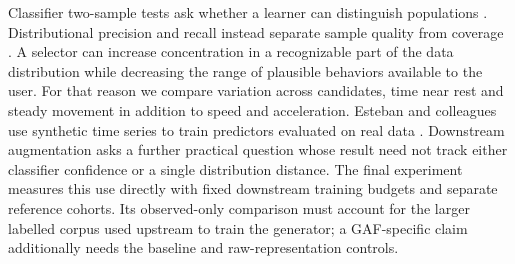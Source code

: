Classifier two-sample tests ask whether a learner can distinguish populations \cite{c2st}. Distributional precision and recall instead separate sample quality from coverage \cite{prd,pr}. A selector can increase concentration in a recognizable part of the data distribution while decreasing the range of plausible behaviors available to the user. For that reason we compare variation across candidates, time near rest and steady movement in addition to speed and acceleration. Esteban and colleagues use synthetic time series to train predictors evaluated on real data \cite{tstr}. Downstream augmentation asks a further practical question whose result need not track either classifier confidence or a single distribution distance. The final experiment measures this use directly with fixed downstream training budgets and separate reference cohorts. Its observed-only comparison must account for the larger labelled corpus used upstream to train the generator; a GAF-specific claim additionally needs the baseline and raw-representation controls.
